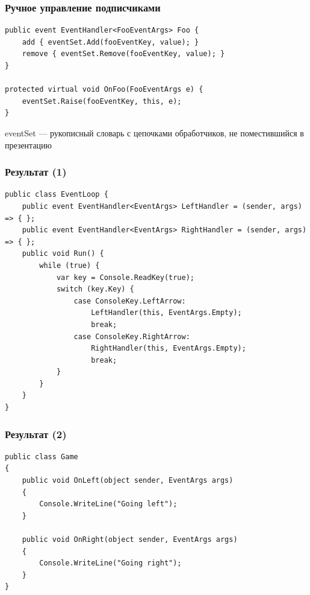 \documentclass[xetex,mathserif,serif]{beamer}
\begin{document}
    \begin{frame}[fragile]
        \frametitle{Ручное управление подписчиками}
        \begin{verbatim}
public event EventHandler<FooEventArgs> Foo {
    add { eventSet.Add(fooEventKey, value); }
    remove { eventSet.Remove(fooEventKey, value); }
}

protected virtual void OnFoo(FooEventArgs e) {
    eventSet.Raise(fooEventKey, this, e);
}
        \end{verbatim}
        \vspace{7mm}
        eventSet --- рукописный словарь с цепочками обработчиков, не поместившийся в презентацию
    \end{frame}

    \begin{frame}[fragile]
        \frametitle{Результат (1)}
        \begin{footnotesize}
            \begin{verbatim}
public class EventLoop {
    public event EventHandler<EventArgs> LeftHandler = (sender, args) => { };
    public event EventHandler<EventArgs> RightHandler = (sender, args) => { };
    public void Run() {
        while (true) {
            var key = Console.ReadKey(true);
            switch (key.Key) {
                case ConsoleKey.LeftArrow:
                    LeftHandler(this, EventArgs.Empty);
                    break;
                case ConsoleKey.RightArrow:
                    RightHandler(this, EventArgs.Empty);
                    break;
            }
        }
    }
}
            \end{verbatim}
        \end{footnotesize}
    \end{frame}

    \begin{frame}[fragile]
        \frametitle{Результат (2)}
        \begin{footnotesize}
            \begin{verbatim}
public class Game
{
    public void OnLeft(object sender, EventArgs args)
    {
        Console.WriteLine("Going left");
    }

    public void OnRight(object sender, EventArgs args)
    {
        Console.WriteLine("Going right");
    }
}
            \end{verbatim}
        \end{footnotesize}
    \end{frame}
\end{document}
